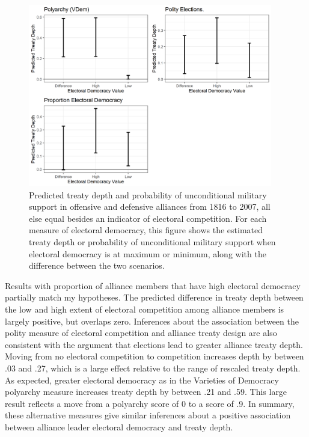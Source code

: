 \documentclass[12pt]{article}
\begin{document}
\begin{figure}[hbtp]
\centering
\includegraphics[width=0.95\textwidth]{results-other-democ.png}
\caption{Predicted treaty depth and probability of unconditional military support in offensive and defensive alliances from 1816 to 2007, all else equal besides an indicator of electoral competition. For each measure of electoral democracy, this figure shows the estimated treaty depth or probability of unconditional military support when electoral democracy is at maximum or minimum, along with the difference between the two scenarios.}
\label{fig:results-other-democ}
\end{figure}


Results with proportion of alliance members that have high electoral democracy partially match my hypotheses.  
The predicted difference in treaty depth between the low and high extent of electoral competition among alliance members is largely positive, but overlaps zero. 
Inferences about the association between the polity measure of electoral competition and alliance treaty design are also consistent with the argument that elections lead to greater alliance treaty depth.
Moving from no electoral competition to competition increases depth by between .03 and .27, which is a large effect relative to the range of rescaled treaty depth. 
As expected, greater electoral democracy as in the Varieties of Democracy polyarchy measure increases treaty depth by between .21 and .59.
This large result reflects a move from a polyarchy score of 0 to a score of .9. 
In summary, these alternative measures give similar inferences about a positive association between alliance leader electoral democracy and treaty depth. 
\end{document}
